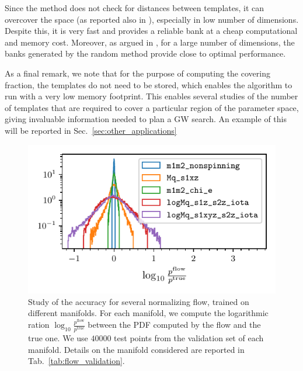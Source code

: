 \documentclass[twocolumn,showpacs,preprintnumbers,nofootinbib,prd,
superscriptaddress,10pt]{revtex4-2}
\begin{document}
Since the method does not check for distances between templates, it can overcover the space (as reported also in \cite{Messenger:2008ta, Coogan:2022qxs}), especially in low number of dimensions.
Despite this, it is very fast and provides a reliable bank at a cheap computational and memory cost.
Moreover, as argued in \cite{Messenger:2008ta, Allen:2021yuy, Allen:2022lqr}, for a large number of dimensions, the banks generated by the random method provide close to optimal performance.

As a final remark, we note that for the purpose of computing the covering fraction, the templates do not need to be stored, which enables the algorithm to run with a very low memory footprint.
This enables several studies of the number of templates that are required to cover a particular region of the parameter space, giving invaluable information needed to plan a GW search. An example of this will be reported in Sec.~\ref{sec:other_applications}

\begin{figure}[t]
	\centering
	\includegraphics[scale = 1.]{flow_validation}
	\caption{Study of the accuracy for several normalizing flow, trained on different manifolds. For each manifold, we compute the logarithmic ration $\log_{10}\frac{p^\mathrm{flow}}{p^\mathrm{true}}$ between the PDF computed by the flow and the true one. We use $40000$ test points from the validation set of each manifold. Details on the manifold considered are reported in Tab.~\ref{tab:flow_validation}.}
	\label{fig:flow_validation}
\end{figure}
\end{document}
